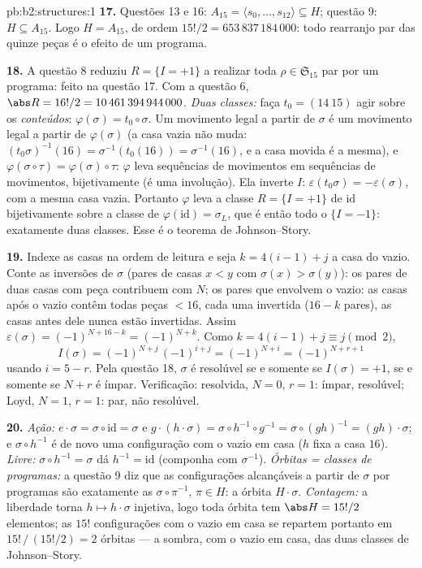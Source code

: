 \begin{solution}{pb:b2:structures:1}
\textbf{17.} Questões 13 e 16: $A_{15} = \langle s_0, \dots,
s_{12}\rangle \subseteq H$; questão 9: $H \subseteq A_{15}$. Logo
$H = A_{15}$, de ordem $15!/2 = 653\,837\,184\,000$: todo rearranjo par
das quinze peças é o efeito de um programa.

\textbf{18.} A questão 8 reduziu $R = \{I = +1\}$ a realizar
toda $\rho \in \mathfrak{S}_{15}$ par por um programa: feito na
questão 17. Com a questão 6, $\abs R = 16!/2 =
10\,461\,394\,944\,000$. \emph{Duas classes:} faça $t_0 = (14\
15)$ agir sobre os \emph{conteúdos}: $\varphi(\sigma) = t_0 \circ
\sigma$. Um movimento legal a partir de $\sigma$ é um movimento legal a partir de
$\varphi(\sigma)$ (a casa vazia não muda:
$(t_0\sigma)^{-1}(16) = \sigma^{-1}(t_0(16)) = \sigma^{-1}(16)$,
e a casa movida é a mesma), e $\varphi(\sigma \circ \tau)
= \varphi(\sigma) \circ \tau$: $\varphi$ leva sequências de movimentos em
sequências de movimentos, bijetivamente (é uma involução). Ela inverte $I$:
$\varepsilon(t_0\sigma) = -\varepsilon(\sigma)$, com a mesma casa
vazia. Portanto $\varphi$ leva a classe $R = \{I = +1\}$ de
$\mathrm{id}$ bijetivamente sobre a classe de $\varphi(\mathrm{id})
= \sigma_L$, que é então todo o $\{I = -1\}$: exatamente duas
classes. Esse é o teorema de Johnson--Story.

\textbf{19.} Indexe as casas na ordem de leitura e seja $k = 4(i -
1) + j$ a casa do vazio. Conte as inversões de $\sigma$
(pares de casas $x < y$ com $\sigma(x) > \sigma(y)$): os pares de
duas casas com peça contribuem com $N$; os pares que envolvem o vazio: as casas
após o vazio contêm todas peças $< 16$, cada uma invertida ($16 - k$
pares), as casas antes dele nunca estão invertidas. Assim
$\varepsilon(\sigma) = (-1)^{N + 16 - k} = (-1)^{N + k}$. Como
$k = 4(i-1) + j \equiv j \pmod 2$,
\[
I(\sigma) = (-1)^{N + j}\,(-1)^{i + j} = (-1)^{N + i}
= (-1)^{N + r + 1}
\]
usando $i = 5 - r$. Pela questão 18, $\sigma$ é resolúvel se e somente se
$I(\sigma) = +1$, se e somente se $N + r$ é ímpar. Verificação: resolvida, $N = 0$, $r
= 1$: ímpar, resolúvel; Loyd, $N = 1$, $r = 1$: par, não resolúvel.

\textbf{20.} \emph{Ação:} $e \cdot \sigma = \sigma \circ
\mathrm{id} = \sigma$ e $g \cdot (h \cdot \sigma) = \sigma
\circ h^{-1} \circ g^{-1} = \sigma \circ (gh)^{-1} = (gh) \cdot
\sigma$; e $\sigma \circ h^{-1}$ é de novo uma configuração
com o vazio em casa ($h$ fixa a casa $16$). \emph{Livre:} $\sigma \circ
h^{-1} = \sigma$ dá $h^{-1} = \mathrm{id}$ (componha com
$\sigma^{-1}$). \emph{Órbitas = classes de programas:} a questão 9
diz que as configurações alcançáveis a partir de $\sigma$ por programas são
exatamente as $\sigma \circ \pi^{-1}$, $\pi \in H$: a órbita $H
\cdot \sigma$. \emph{Contagem:} a liberdade torna $h \mapsto h \cdot
\sigma$ injetiva, logo toda órbita tem $\abs H = 15!/2$ elementos;
as $15!$ configurações com o vazio em casa se repartem portanto em
$15!\,/\,(15!/2) = 2$ órbitas --- a sombra, com o vazio em casa, das
duas classes de Johnson--Story.


\end{solution}
